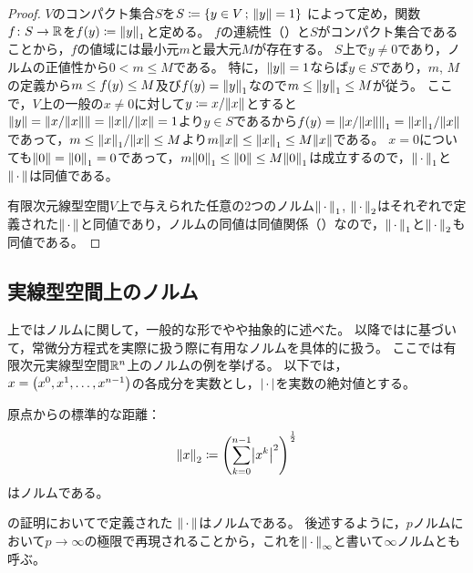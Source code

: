 \documentclass[b5paper,draft]{ltjsbook}
\begin{document}
\begin{thm}[有限次元線型空間上のノルムの同値性]
\begin{proof}
        $V$のコンパクト集合$S$を$S\coloneqq \sset{y\in V}{\norm{y}=1}$
        によって定め，関数$f\colon S\to \mathbb{R}$を$\fun{f}{y}\coloneqq \norm{y}_1$と定める。
        $f$の連続性（）と$S$がコンパクト集合であることから，$f$の値域には最小元$m$と最大元$M$が存在する。
        $S$上で$y\ne {0}$であり，ノルムの正値性から$0<m\leq M$である。
        特に，$\norm{y}=1$ならば$y\in S$であり，$m$, $M$の定義から$m\leq \fun{f}{y}\leq M$及び$\fun{f}{y}=\norm{y}_1$なので$m\leq \norm{y}_1\leq M$が従う。
        ここで，$V$上の一般の$x\ne 0$に対して$y\coloneqq x / \norm{x}$とすると$\norm{y}=\norm{x/\norm{x}}=\norm{x}/\norm{x}=1$より$y\in S$であるから$\fun{f}{y}=\norm{x/\norm{x}}_1=\norm{x}_1/\norm{x}$であって，$m\leq \norm{x}_1/\norm{x}\leq M$より$m\norm{x}\leq \norm{x}_1\leq M\norm{x}$である。
        $x=0$についても$\norm{0}=\norm{0}_1=0$であって，$m \norm{0}_1\leq \norm{0}\leq M\norm{0}_1$は成立するので，$\norm{\dummy}_1$と$\norm{\dummy}$は同値である。

        有限次元線型空間$V$上で与えられた任意の2つのノルム$\norm{\dummy}_1$, $\norm{\dummy}_2$はそれぞれで定義された$\norm{\dummy}$と同値であり，ノルムの同値は同値関係（）なので，$\norm{\dummy}_1$と$\norm{\dummy}_2$も同値である。
    \end{proof}
\end{thm}


\subsection{実線型空間上のノルム}
上ではノルムに関して，一般的な形でやや抽象的に述べた。
以降では\cite{takano}に基づいて，常微分方程式を実際に扱う際に有用なノルムを具体的に扱う。
ここでは有限次元実線型空間$\mathbb{R}^n$上のノルムの例を挙げる。
以下では，$x=\pare{x^0,x^1,\dots,x^{n-1}}$の各成分を実数とし，$\abs{\dummy}$を実数の絶対値とする。

\begin{eg}[Euclidノルム]
    原点からの標準的な距離：
    \begin{equation}
        \norm{x}_2\coloneqq \pare{\sum_{k=0}^{n-1} \abs{x^k}^2}^{\frac{1}{2}}
    \end{equation}
    はノルムである。
\end{eg}

\begin{eg}[一様ノルム]
    の証明においてで定義された
    $\norm{\dummy}$はノルムである。
    後述するように，$p$ノルムにおいて$p\to\infty$の極限で再現されることから，これを$\norm{\dummy}_\infty$と書いて$\infty$ノルムとも呼ぶ。
\end{eg}
\end{document}
